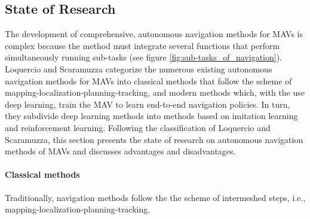 \subsection{State of Research}

The development of comprehensive, autonomous navigation methods for MAVs is complex 
because the method must integrate several functions that perform simultaneously running sub-tasks (see figure \ref{fig:sub-tasks_of_navigation}).
Loquercio and Scaramuzza \cite{loquercio2018learning} categorize the numerous existing autonomous navigation methods for MAVs
into classical methods that follow the scheme of mapping-localization-planning-tracking,
and modern methods which, with the use deep learning, train the MAV to learn end-to-end navigation policies.
In turn, they subdivide deep learning methods into methods based on imitation learning and reinforcement learning.
Following the classification of Loquercio and Scaramuzza, 
this section presents the state of research on autonomous navigation methods of MAVs and discusses advantages and disadvantages.


%
%
%
%


\paragraph{Classical methods}

Traditionally, navigation methods follow the the scheme of intermeshed steps, i.e., mapping-localization-planning-tracking.

